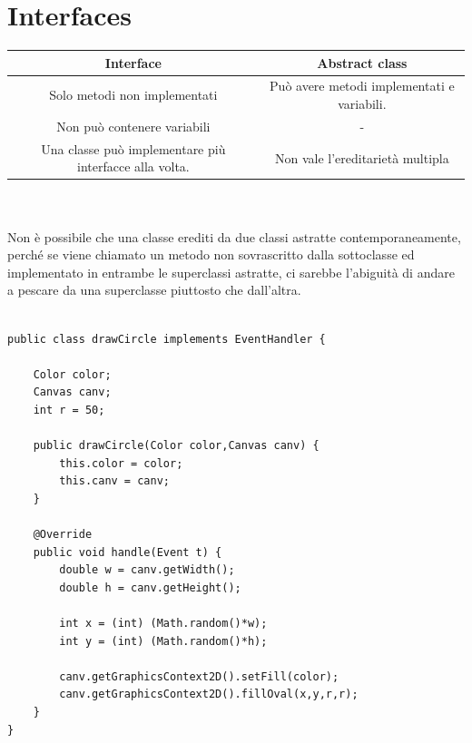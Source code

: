 \documentclass[10pt,a4paper]{book}
\begin{document}
\section{Interfaces}
\begin{tabular}{|c|c|}
\hline 
Interface & Abstract class \\ 
\hline 
Solo metodi non implementati & Può avere metodi implementati e variabili.\\
Non può contenere variabili & -\\
Una classe può implementare più interfacce alla volta. & Non vale l'ereditarietà multipla\\
\hline 
\end{tabular} 
\\\\
Non è possibile che una classe erediti da due classi astratte contemporaneamente, perché se viene chiamato un metodo non sovrascritto dalla sottoclasse ed implementato in entrambe le superclassi astratte, ci sarebbe l'abiguità di andare a pescare da una superclasse piuttosto che dall'altra.
\\\\
\begin{verbatim}
public class drawCircle implements EventHandler {

    Color color;
    Canvas canv;
    int r = 50;
    
    public drawCircle(Color color,Canvas canv) {
        this.color = color;
        this.canv = canv;
    }
    
    @Override
    public void handle(Event t) {
        double w = canv.getWidth();
        double h = canv.getHeight();
        
        int x = (int) (Math.random()*w);
        int y = (int) (Math.random()*h);
        
        canv.getGraphicsContext2D().setFill(color);
        canv.getGraphicsContext2D().fillOval(x,y,r,r);
    }
} 

\end{verbatim}
\newpage
\end{document}
